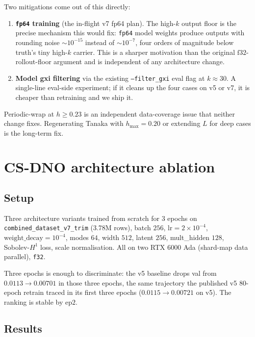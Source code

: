 \documentclass[11pt,letterpaper]{article}
\begin{document}
Two mitigations come out of this directly:
\begin{enumerate}[leftmargin=1.4em,topsep=0pt,itemsep=2pt]
  \item \textbf{\texttt{fp64} training} (the in-flight v7 fp64 plan). The high-$k$ output
        floor is the precise mechanism this would fix: \texttt{fp64} model weights produce
        outputs with rounding noise $\sim 10^{-15}$ instead of $\sim 10^{-7}$, four
        orders of magnitude below truth's tiny high-$k$ carrier. This is a sharper
        motivation than the original $\mathrm{f32}$-rollout-floor argument and is independent
        of any architecture change.
  \item \textbf{Model gxi filtering} via the existing \texttt{--filter\_gxi} eval flag at
        $k\!\approx\!30$. A single-line eval-side experiment; if it cleans up the four
        cases on v5 or v7, it is cheaper than retraining and we ship it.
\end{enumerate}
Periodic-wrap at $h\!\geq\!0.23$ is an independent data-coverage issue that neither change
fixes. Regenerating Tanaka with $h_{\max}\!=\!0.20$ or extending $L$ for deep cases is the
long-term fix.

\section{CS-DNO architecture ablation}

\subsection{Setup}

Three architecture variants trained from scratch for $3$ epochs on
\texttt{combined\_dataset\_v7\_trim} (3.78M rows), batch $256$, $\mathrm{lr}=2\!\times\!10^{-4}$,
$\mathrm{weight\_decay}=10^{-4}$, modes $64$, width $512$, latent $256$, mult\_hidden $128$,
Sobolev-$H^{1}$ loss, scale normalisation. All on two RTX 6000 Ada (shard-map data
parallel), \texttt{f32}.

Three epochs is enough to discriminate: the v5 baseline drops val from $0.0113\!\to\!0.00701$
in those three epochs, the same trajectory the published v5 80-epoch retrain traced in its
first three epochs ($0.0115\!\to\!0.00721$ on v5). The ranking is stable by ep$2$.

\subsection{Results}
\end{document}

